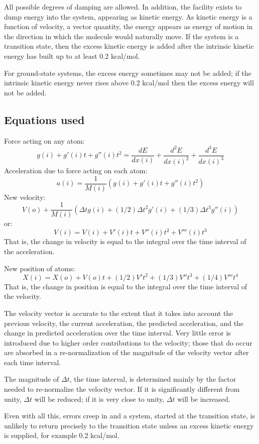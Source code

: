 All possible degrees of damping  are  allowed.   In  addition,  the facility
exists  to  dump  energy into the system, appearing as kinetic energy.  As
kinetic energy is a function of velocity, a vector quantity, the  energy
appears  as  energy of motion in the direction in which the molecule would
naturally move.  If the system  is  a  transition  state, then  the  excess
kinetic  energy  is added after the intrinsic kinetic energy has built up to at
least 0.2 kcal/mol.

For ground-state systems, the excess energy sometimes  may  not  be added;  if
the  intrinsic kinetic energy never rises above 0.2 kcal/mol then the excess
energy will not be added.


\subsection*{Equations used}
Force acting on any atom:
$$ g(i) + g'(i)t + g''(i)t^2 = \frac{dE}{dx(i)} +
        \frac{d^2E}{dx(i)^2} + \frac{d^3E}{dx(i)^3} $$
Acceleration due to force acting on each atom:
$$ a(i) = \frac{1}{M(i)} (g(i) + g'(i)t + g''(i)t^2) $$
New velocity:
$$ V(o) + \frac{1}{M(i)} \left(\Delta t g(i) + (1/2) \Delta  t^2 g'(i) +
(1/3) \Delta t^3g''(i)\right) $$
or:
$$ V(i) = V(i) + V'(i)t + V''(i)t^2 + V'''(i)t^3 $$
That is, the change in velocity is equal to the integral  over  the
time interval of the acceleration.

New position of atoms:
$$ X(i) = X(o) + V(o)t + (1/2) V't^2 + (1/3) V''t^3 + (1/4) V'''t^4 $$
That is, the change in position is equal to the integral  over  the
time interval of the velocity.

The velocity vector is accurate to the extent that  it  takes  into account
the  previous velocity, the current acceleration, the predicted acceleration,
and the change in predicted  acceleration  over  the  time interval.    Very
little  error  is  introduced  due  to  higher  order contributions to the
velocity; those that do occur  are  absorbed  in  a re-normalization of the
magnitude of the velocity vector after each time interval.

The magnitude of $\Delta t$, the time interval, is determined mainly by the
factor   needed   to   re-normalize  the  velocity  vector.   If  it  is
significantly different from unity, $\Delta t$ will be reduced; if  it  is
very close to unity, $\Delta t$ will be increased.

Even with all this, errors creep in and a system,  started  at  the transition
state,  is  unlikely  to  return precisely to the transition state  unless  an
excess  kinetic  energy  is  supplied,  for   example 0.2 kcal/mol.

